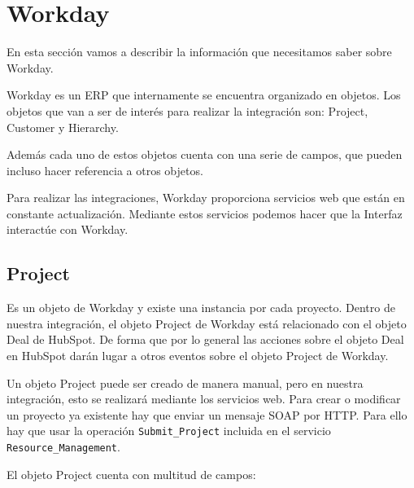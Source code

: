 \section{Workday}

En esta sección vamos a describir la información que necesitamos saber sobre Workday.

Workday es un ERP que internamente se encuentra organizado en objetos. Los objetos que van a ser de interés para realizar la integración son:
Project, Customer y Hierarchy.

Además cada uno de estos objetos cuenta con una serie de campos, que pueden incluso hacer referencia a otros objetos.


Para realizar las integraciones, Workday proporciona servicios web que están en constante actualización.
Mediante estos servicios podemos hacer que la Interfaz interactúe con Workday.



\subsection{Project}
Es un objeto de Workday y existe una instancia por cada proyecto. Dentro de nuestra integración, 
el objeto Project de Workday está relacionado con el objeto Deal de HubSpot. 
De forma que por lo general las acciones sobre el objeto Deal en HubSpot darán lugar a otros eventos
 sobre el objeto Project de Workday.
 
Un objeto Project puede ser creado de manera manual, pero en nuestra integración, esto se realizará mediante los servicios web.
Para crear o modificar un proyecto ya existente hay que enviar un mensaje SOAP por HTTP. 
Para ello hay que usar la operación \verb|Submit_Project|  incluida en el servicio \verb|Resource_Management|.

El objeto Project cuenta con multitud de campos: 

